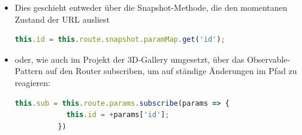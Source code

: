 \begin{itemize}
    \item Dies geschieht entweder über die Snapshot-Methode, die den momentanen Zustand der URL ausliest 
    \begin{lstlisting}[caption={Snapshot der URL abfragen},language=TypeScript,label=lst:impl:routingsnapshot]
        this.id = this.route.snapshot.paramMap.get('id');
    \end{lstlisting}
    \item oder, wie auch im Projekt der 3D-Gallery umgesetzt, über das Observable-Pattern auf den Router subscriben, um auf ständige Änderungen im Pfad zu reagieren:
    \begin{lstlisting}[caption={Die URL subscriben},language=TypeScript,label=lst:impl:urlsubscription]
        this.sub = this.route.params.subscribe(params => {
            this.id = +params['id'];
          })
    \end{lstlisting}
\end{itemize}
\cite{AngularBuch}